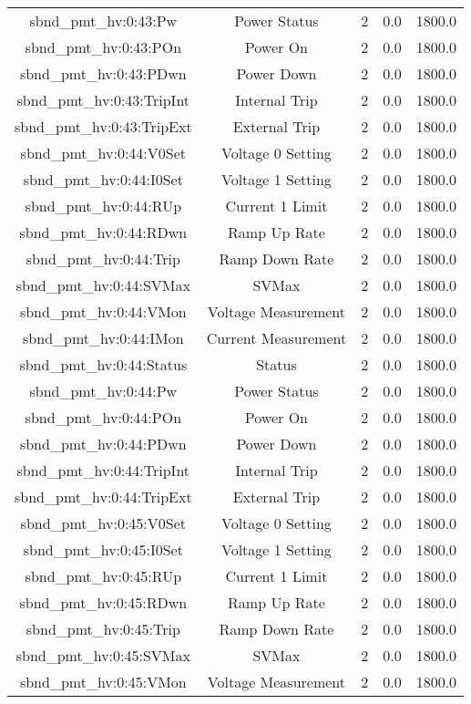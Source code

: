 \begin{table}[ptb]
\begin{tabular}{c | c c c c}
sbnd_pmt_hv:0:43:Pw & Power Status & 2 & 0.0 & 1800.0\\ 
sbnd_pmt_hv:0:43:POn & Power On & 2 & 0.0 & 1800.0\\ 
sbnd_pmt_hv:0:43:PDwn & Power Down & 2 & 0.0 & 1800.0\\ 
sbnd_pmt_hv:0:43:TripInt & Internal Trip & 2 & 0.0 & 1800.0\\ 
sbnd_pmt_hv:0:43:TripExt & External Trip & 2 & 0.0 & 1800.0\\ 
sbnd_pmt_hv:0:44:V0Set & Voltage 0 Setting & 2 & 0.0 & 1800.0\\ 
sbnd_pmt_hv:0:44:I0Set & Voltage 1 Setting & 2 & 0.0 & 1800.0\\ 
sbnd_pmt_hv:0:44:RUp & Current 1 Limit & 2 & 0.0 & 1800.0\\ 
sbnd_pmt_hv:0:44:RDwn & Ramp Up Rate & 2 & 0.0 & 1800.0\\ 
sbnd_pmt_hv:0:44:Trip & Ramp Down Rate & 2 & 0.0 & 1800.0\\ 
sbnd_pmt_hv:0:44:SVMax & SVMax & 2 & 0.0 & 1800.0\\ 
sbnd_pmt_hv:0:44:VMon & Voltage Measurement & 2 & 0.0 & 1800.0\\ 
sbnd_pmt_hv:0:44:IMon & Current Measurement & 2 & 0.0 & 1800.0\\ 
sbnd_pmt_hv:0:44:Status & Status & 2 & 0.0 & 1800.0\\ 
sbnd_pmt_hv:0:44:Pw & Power Status & 2 & 0.0 & 1800.0\\ 
sbnd_pmt_hv:0:44:POn & Power On & 2 & 0.0 & 1800.0\\ 
sbnd_pmt_hv:0:44:PDwn & Power Down & 2 & 0.0 & 1800.0\\ 
sbnd_pmt_hv:0:44:TripInt & Internal Trip & 2 & 0.0 & 1800.0\\ 
sbnd_pmt_hv:0:44:TripExt & External Trip & 2 & 0.0 & 1800.0\\ 
sbnd_pmt_hv:0:45:V0Set & Voltage 0 Setting & 2 & 0.0 & 1800.0\\ 
sbnd_pmt_hv:0:45:I0Set & Voltage 1 Setting & 2 & 0.0 & 1800.0\\ 
sbnd_pmt_hv:0:45:RUp & Current 1 Limit & 2 & 0.0 & 1800.0\\ 
sbnd_pmt_hv:0:45:RDwn & Ramp Up Rate & 2 & 0.0 & 1800.0\\ 
sbnd_pmt_hv:0:45:Trip & Ramp Down Rate & 2 & 0.0 & 1800.0\\ 
sbnd_pmt_hv:0:45:SVMax & SVMax & 2 & 0.0 & 1800.0\\ 
sbnd_pmt_hv:0:45:VMon & Voltage Measurement & 2 & 0.0 & 1800.0\\ 

\end{tabular}
\end{table}
